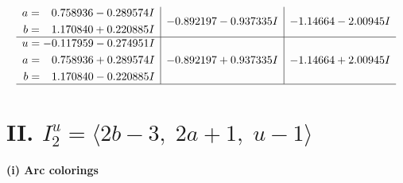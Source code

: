 \documentclass[1p]{elsarticle_modified}
\theoremstyle{definition}
\begin{document}
$$\begin{array}{c|c|c}
\begin{aligned}
a &= \phantom{-}0.758936 - 0.289574 I \\
b &= \phantom{-}1.170840 + 0.220885 I\end{aligned}
 & -0.892197 - 0.937335 I & -1.14664 - 2.00945 I \\ \hline\begin{aligned}
u &= -0.117959 - 0.274951 I \\
a &= \phantom{-}0.758936 + 0.289574 I \\
b &= \phantom{-}1.170840 - 0.220885 I\end{aligned}
 & -0.892197 + 0.937335 I & -1.14664 + 2.00945 I\\
 \hline 
 \end{array}$$\newpage\newpage\renewcommand{\arraystretch}{1}
\centering \section*{II. $I^u_{2}= \langle 2 b-3,\;2 a+1,\;u-1 \rangle$}
\flushleft \textbf{(i) Arc colorings}\\
\end{document}
